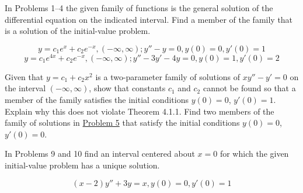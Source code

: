 \documentclass[chapter=4,section=1]{math252homework}
\begin{document}
In Problems 1--4 the given family of functions is the general solution of the differential equation on the indicated interval. Find a member of the family that is a solution of the initial-value problem.
\begin{problems}
	\problem \[ y = c_{1}e^{x} + c_{2}e^{-x}, (-\infty, \infty); y'' - y = 0, y(0) = 0, y'(0)=1 \]
	\problem \[ y = c_{1}e^{4x} + c_{2}e^{-x}, (-\infty, \infty); y'' - 3y' - 4y = 0, y(0) = 1, y'(0) = 2 \]
\end{problems}

\begin{problems}[start=5]
    \problem Given that $y=c_{1} + c_{2}x^{2}$ is a two-parameter family of solutions of $xy'' - y' = 0$ on the interval $(-\infty, \infty)$, show that constants $c_{1}$ and $c_{2}$ cannot be found so that a member of the family satisfies the initial conditions $y(0)=0$, $y'(0)=1$. Explain why this does not violate Theorem 4.1.1.
	\problem Find two members of the family of solutions in \hyperref[prb:5]{Problem 5} that satisfy the initial conditions $y(0)=0$, $y'(0)=0$.
\end{problems}

In Problems 9 and 10 find an interval centered about $x=0$ for which the given initial-value problem has a unique solution.
\begin{problems}[start=9]
    \problem \[ (x-2)y'' + 3y = x, y(0)=0, y'(0)=1 \]
\end{problems}
\end{document}
